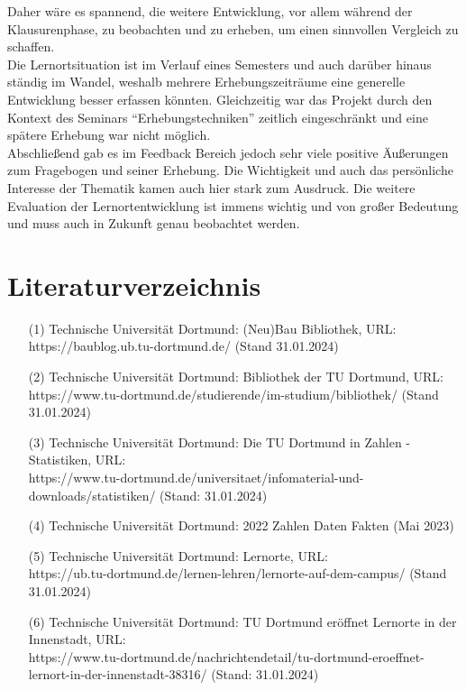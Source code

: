 \documentclass[11pt, a4paper]{article}
\begin{document}
Daher wäre es spannend, die weitere Entwicklung, vor allem während der Klausurenphase, zu beobachten und zu erheben, um einen sinnvollen Vergleich zu schaffen.\\
Die Lernortsituation ist im Verlauf eines Semesters und auch darüber hinaus ständig im Wandel, weshalb mehrere Erhebungszeiträume eine generelle Entwicklung besser erfassen könnten. Gleichzeitig war das Projekt durch den Kontext des Seminars “Erhebungstechniken” zeitlich eingeschränkt und eine spätere Erhebung war nicht möglich.\\
Abschließend gab es im Feedback Bereich jedoch sehr viele positive Äußerungen zum Fragebogen und seiner Erhebung. Die Wichtigkeit und auch das persönliche Interesse der Thematik kamen auch hier stark zum Ausdruck. Die weitere Evaluation der Lernortentwicklung ist immens wichtig und von großer Bedeutung und muss auch in Zukunft genau beobachtet werden.

\newpage

\section{Literaturverzeichnis}
\label{seitenverweis}
\vspace{0.5cm}
\begin{enumerate}
	
\item[(1)] Technische Universität Dortmund: (Neu)Bau Bibliothek, URL: \\ https://baublog.ub.tu-dortmund.de/ (Stand 31.01.2024) \\

\item [(2)] Technische Universität Dortmund: Bibliothek der TU Dortmund, URL: \\ https://www.tu-dortmund.de/studierende/im-studium/bibliothek/ (Stand 31.01.2024) \\

\item [(3)] Technische Universität Dortmund: Die TU Dortmund in Zahlen - Statistiken, URL: \\ https://www.tu-dortmund.de/universitaet/infomaterial-und-downloads/statistiken/ (Stand: 31.01.2024) \\

\item [(4)] Technische Universität Dortmund: 2022 Zahlen Daten Fakten (Mai 2023) \\

\item [(5)] Technische Universität Dortmund: Lernorte, URL: \\ https://ub.tu-dortmund.de/lernen-lehren/lernorte-auf-dem-campus/ (Stand 31.01.2024) \\

\item [(6)] Technische Universität Dortmund: TU Dortmund eröffnet Lernorte in der Innenstadt, URL: \\ https://www.tu-dortmund.de/nachrichtendetail/tu-dortmund-eroeffnet-lernort-in-der-innenstadt-38316/ (Stand: 31.01.2024)

\end{enumerate}
\end{document}
